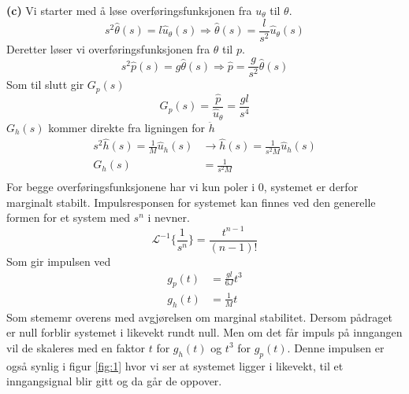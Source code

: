 \documentclass[11pt, a4paper, norsk]{rapport1} %
\begin{document}
\textbf{(c)} Vi starter med å løse overføringsfunksjonen fra $u_\theta$ til $\theta$.
\begin{equation}
    \label{eq:6}
    s^2\hat{\theta}(s) = l\hat{u}_\theta(s) \Rightarrow \hat{\theta}(s) = \frac{l}{s^2}\hat{u}_\theta(s)
\end{equation}
Deretter løser vi overføringsfunksjonen fra $\theta$ til $p$.
\begin{equation}
    s^2\hat{p}(s) = g\hat{\theta}(s) \Rightarrow \hat{p} = \frac{g}{s^2} \hat{\theta}(s)
\end{equation} 
Som til slutt gir $G_p(s)$ 
\begin{equation}
    G_p(s) = \frac{\hat{p}}{\hat{u}_\theta} = \frac{gl}{s^4}
\end{equation}
$G_h(s)$ kommer direkte fra ligningen for $\ddot{h}$
\begin{equation}
    \begin{aligned}
        s^2\hat{h}(s) = \frac{1}{M}\hat{u}_h(s) &\rightarrow \hat{h}(s) = \frac{1}{s^2M} \hat{u}_h(s) \\
        G_h(s) &= \frac{1}{s^2M} \\
    \end{aligned}
\end{equation}
For begge overføringsfunksjonene har vi kun poler i 0, systemet er derfor marginalt stabilt.
Impulsresponsen for systemet kan finnes ved den generelle formen for et system med $s^n$ i nevner.
\begin{equation}
    \mathcal{L}^{-1}\{\frac{1}{s^n}\} = \frac{t^{n-1}}{(n-1)!}
\end{equation}
Som gir impulsen ved 
\begin{equation}
    \begin{aligned}
        g_p(t) &= \frac{gl}{6J}t^3 \\
        g_h(t) &=\frac{1}{M}t
    \end{aligned}
\end{equation}
Som stememr overens med avgjørelsen om marginal stabilitet. Dersom pådraget er null forblir systemet i likevekt rundt null.
Men om det får impuls på inngangen vil de skaleres med en faktor $t$ for $g_h(t)$ og $t^3$ for $g_p(t)$.
Denne impulsen er også synlig i figur \ref{fig:1} hvor vi ser at systemet ligger i likevekt, til et inngangsignal blir gitt og da går de oppover.
\end{document}
